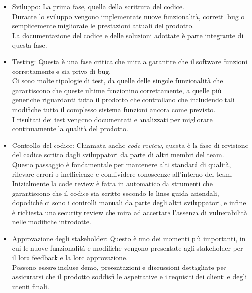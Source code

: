 \begin{itemize}
  \item Sviluppo: La prima fase, quella della scrittura del codice.\\ Durante lo
    sviluppo vengono implementate nuove funzionalità, corretti bug o
    semplicemente migliorate le prestazioni attuali del prodotto.\\ La
    documentazione del codice e delle soluzioni adottate è parte integrante di
    questa fase.

  \item Testing: Questa è una fase critica che mira a garantire che il software
    funzioni correttamente e sia privo di bug.\\ Ci sono molte tipologie di test,
    da quelle delle singole funzionalità che garantiscono che queste ultime funzionino
    correttamente, a quelle più generiche riguardanti tutto il prodotto che
    controllano che includendo tali modifiche tutto il complesso sistema
    funzioni ancora come previsto.\\ I risultati dei test vengono documentati e
    analizzati per migliorare continuamente la qualità del prodotto.

  \item Controllo del codice: Chiamata anche \textit{code review}, questa è la
    fase di revisione del codice scritto dagli sviluppatori da parte di altri
    membri del team.\\ Questo passaggio è fondamentale per mantenere alti
    standard di qualità, rilevare errori o inefficienze e condividere conoscenze
    all'interno del team.\\ Inizialmente la code review è fatta in automatico da
    strumenti che garantiscono che il codice sia scritto secondo le linee guida aziendali,
    dopodiché ci sono i controlli manuali da parte degli altri sviluppatori, e infine
    è richiesta una security review che mira ad accertare l'assenza di vulnerabilità
    nelle modifiche introdotte.

  \item Approvazione degli stakeholder: Questo è uno dei momenti più importanti,
    in cui le nuove funzionalità e modifiche vengono presentate agli stakeholder
    per il loro feedback e la loro approvazione.\\ Possono essere incluse demo,
    presentazioni e discussioni dettagliate per assicurarsi che il prodotto
    soddisfi le aspettative e i requisiti dei clienti e degli utenti finali.


\end{itemize}

